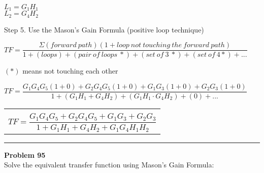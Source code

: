 \documentclass[11pt,letterpaper]{article}
\begin{document}
\begin{center}
\\[15pt]
	$L_1=G_1H_1$\\[18pt]
	$L_2=G_4H_2$\\
\end{center}
Step 5. Use the Mason’s Gain Formula (positive loop technique)\\
\begin{center}
	$TF=\dfrac{\Sigma (forward~path)(1 + loop~not~touching~the~forward~path)}{1 + (loops) + (pair~of~loops~*) + (set~of~3~*) + (set~of~4*) + ...}$
\end{center}
$(*)$ means not touching each other\\
\begin{center}
	$TF=\dfrac{G_1G_4G_5(1+0)+G_2G_4G_5(1+0)+G_1G_3(1+0)+G_2G_3(1+0)}{1+(G_1H_1+G_4H_2)+(G_1H_1\cdot G_4H_2)+(0)+...}$\\[12pt]
	\begin{tabular}{|c|}
		\hline \\
	$TF=\dfrac{G_1G_4G_5+G_2G_4G_5+G_1G_3+G_2G_3}{1+G_1H_1+G_4H_2+G_1G_4H_1H_2}$\\[12pt]
	\hline
	\end{tabular}
\end{center}

\clearpage


\rule{\textwidth}{1pt}
\textbf{Problem 95}\\
Solve the equivalent transfer function using Mason’s Gain Formula:\\
\end{document}
